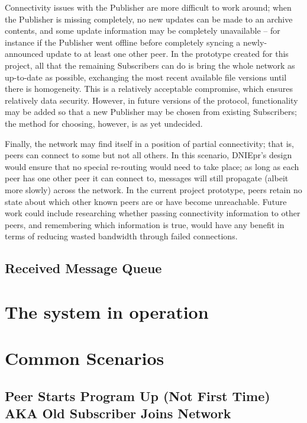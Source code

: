 \documentclass[12pt,a4paper,]{adreport}
\begin{document}
Connectivity issues with the Publisher are more difficult to work
around; when the Publisher is missing completely, no new updates can be
made to an archive contents, and some update information may be
completely unavailable -- for instance if the Publisher went offline
before completely syncing a newly-announced update to at least one other
peer. In the prototype created for this project, all that the remaining
Subscribers can do is bring the whole network as up-to-date as possible,
exchanging the most recent available file versions until there is
homogeneity. This is a relatively acceptable compromise, which ensures
relatively data security. However, in future versions of the protocol,
functionality may be added so that a new Publisher may be chosen from
existing Subscribers; the method for choosing, however, is as yet
undecided.

Finally, the network may find itself in a position of partial
connectivity; that is, peers can connect to some but not all others. In
this scenario, DNIEpr's design would ensure that no special re-routing
would need to take place; as long as each peer has one other peer it can
connect to, messages will still propagate (albeit more slowly) across
the network. In the current project prototype, peers retain no state
about which other known peers are or have become unreachable. Future
work could include researching whether passing connectivity information
to other peers, and remembering which information is true, would have
any benefit in terms of reducing wasted bandwidth through failed
connections.

\subsection{Received Message Queue}\label{received-message-queue}

\section{The system in operation}\label{the-system-in-operation}

\section{Common Scenarios}\label{common-scenarios}

\subsection{Peer Starts Program Up (Not First Time) AKA Old Subscriber
Joins
Network}\label{peer-starts-program-up-not-first-time-aka-old-subscriber-joins-network}
\end{document}
